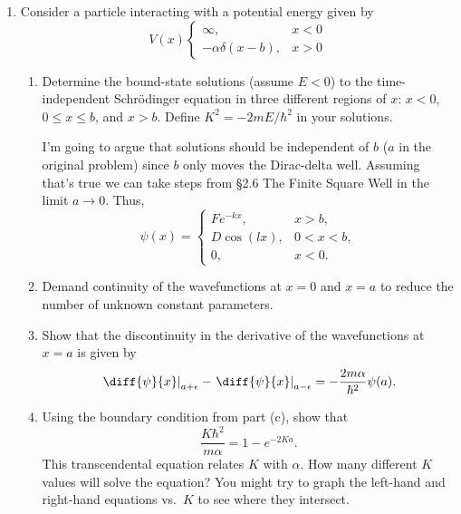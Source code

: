 \documentclass[a4paper, 12pt]{config/homework}
\begin{document}
\begin{enumerate}
\pagebreak
\item Consider a particle interacting with a potential energy given by
\[V(x)\begin{cases}
\infty, & x < 0 \\ -\alpha\delta(x-b), & x>0
\end{cases}\]
\begin{enumerate}
\item Determine the bound-state solutions (assume \(E<0\)) to the time-independent Schr{\"o}dinger equation in three different regions of \(x\): \(x<0\), \(0 \le x \le b\), and \(x > b\). Define \(K^2=-2mE/\hbar^2\) in your solutions.

I'm going to argue that solutions should be independent of \(b\) (\(a\) in the original problem) since \(b\) only moves the Dirac-delta well. Assuming that's true we can take steps from \S 2.6 The Finite Square Well in the limit \(a\to 0\). Thus,
\[\psi(x)=\begin{cases}
Fe^{-kx}, & x > b, \\ D\cos(lx), & 0 < x < b, \\ 0, & x < 0.
\end{cases}\]

\item Demand continuity of the wavefunctions at \(x=0\) and \(x=a\) to reduce the number of unknown constant parameters.



\item Show that the discontinuity in the derivative of the wavefunctions at \(x=a\) is given by
\[\left.\diff{\psi}{x}\right|_{a+\epsilon} - \left.\diff{\psi}{x}\right|_{a-\epsilon} = - \frac{2m\alpha}{\hbar^2}\psi(a).\]


\item Using the boundary condition from part (c), show that
\[\frac{K\hbar^2}{m\alpha} = 1 - e^{-2Ka}.\]
This transcendental equation relates \(K\) with \(\alpha \). How many different \(K\) values will solve the equation? You might try to graph the left-hand and right-hand equations vs.\ \( K \) to see where they intersect.



\end{enumerate}
\end{enumerate}
\end{document}
